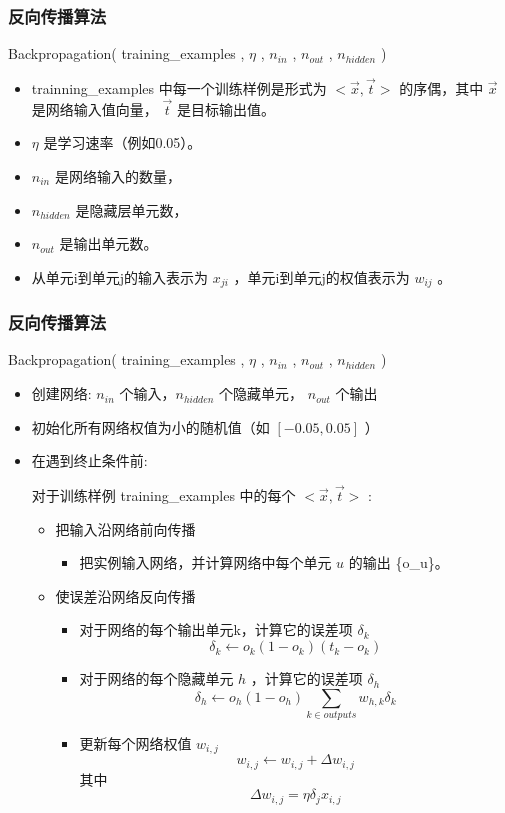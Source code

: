 \documentclass{beamer}
\begin{document}
\begin{frame}
\frametitle{反向传播算法}
\label{sec-3-5}


Backpropagation( training\_{}examples , $\eta$ , $n_{in}$ , $n_{out}$ , $n_{hidden}$ )
\begin{itemize}
\item trainning\_{}examples 中每一个训练样例是形式为 $<\vec{x},\vec{t}>$ 的序偶，其中 $\vec{x}$ 是网络输入值向量， $\vec{t}$ 是目标输出值。
\item $\eta$ 是学习速率（例如0.05）。
\item $n_{in}$ 是网络输入的数量，
\item $n_{hidden}$ 是隐藏层单元数，
\item $n_{out}$ 是输出单元数。
\item 从单元i到单元j的输入表示为 $x_{ji}$ ，单元i到单元j的权值表示为 $w_{ij}$ 。
\end{itemize}
\end{frame}
\begin{frame}
\frametitle{反向传播算法}
\label{sec-3-6}

Backpropagation( training\_{}examples , $\eta$ , $n_{in}$ , $n_{out}$ , $n_{hidden}$ )
\begin{itemize}
\item 创建网络: $n_{in}$ 个输入，$n_{hidden}$ 个隐藏单元， $n_{out}$ 个输出
\item 初始化所有网络权值为小的随机值（如 $[-0.05,0.05]$ ）
\item 在遇到终止条件前:

     对于训练样例 training\_{}examples 中的每个 $<\vec{x},\vec{t}>$ :
\begin{itemize}
\item 把输入沿网络前向传播
\begin{itemize}
\item 把实例输入网络，并计算网络中每个单元 $u$ 的输出 \{o\_{}u\}。
\end{itemize}
\item 使误差沿网络反向传播
\begin{itemize}
\item 对于网络的每个输出单元k，计算它的误差项 $\delta_{k}$
                   \[\delta_{k} \leftarrow o_{k}(1-o_{k})(t_{k}-o_{k})\]
\item 对于网络的每个隐藏单元 $h$ ，计算它的误差项 $\delta_h$
                  \[\delta_{h} \leftarrow o_{h}(1-o_{h})\sum_{k \in outputs}w_{h,k}\delta_{k}\]
\item 更新每个网络权值 $w_{i,j}$
                  \[w_{i,j} \leftarrow w_{i,j} + \Delta w_{i,j}\]
               其中
                  \[\Delta w_{i,j} = \eta \delta_{j} x_{i,j}\]
\end{itemize}
\end{itemize}
\end{itemize}
\end{frame}
\end{document}
